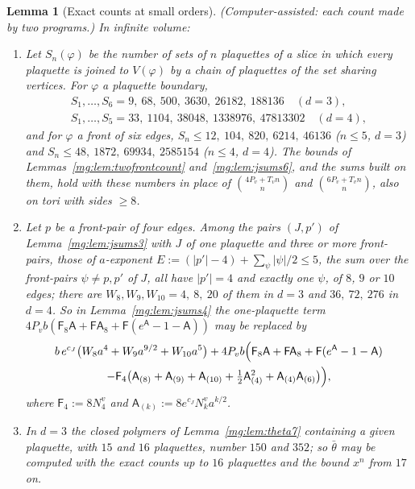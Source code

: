 \documentclass[11pt,a4paper]{article}
\newtheorem{lemma}[theorem]{Lemma}
\theoremstyle{definition}
\theoremstyle{remark}
\begin{document}
\begin{lemma}[Exact counts at small orders]\label{mg:lem:smallcounts}
(Computer-assisted: each count made by two programs.) In infinite volume:
\begin{enumerate}[label=(\roman*)]
\item Let $S_n(\varphi)$ be the number of sets of $n$ plaquettes of a slice in which every plaquette is joined to $V(\varphi)$ by a chain of plaquettes of the set
sharing vertices. For $\varphi$ a plaquette boundary,
\begin{gather*}
S_1,\dots,S_6=9,\ 68,\ 500,\ 3630,\ 26182,\ 188136\quad(d=3),\\
S_1,\dots,S_5=33,\ 1104,\ 38048,\ 1338976,\ 47813302\quad(d=4),
\end{gather*}
and for $\varphi$ a front of six edges, $S_n\le12,\ 104,\ 820,\ 6214,\ 46136$ ($n\le5$, $d=3$) and $S_n\le48,\ 1872,\ 69934,\ 2585154$ ($n\le4$, $d=4$). The bounds of
Lemmas~\ref{mg:lem:twofrontcount} and~\ref{mg:lem:jsums6}, and the sums built on them, hold with these numbers in place of $\binom{4P_v+T_vn}n$ and
$\binom{6P_v+T_vn}n$, also on tori with sides $\ge8$.
\item Let $p$ be a front-pair of four edges. Among the pairs $(J,p')$ of Lemma~\ref{mg:lem:jsums3} with $J$ of one plaquette and three or more front-pairs, those of
$a$-exponent $E:=(|p'|-4)+\sum_\psi|\psi|/2\le5$, the sum over the front-pairs $\psi\ne p,p'$ of $J$, all have $|p'|=4$ and exactly one $\psi$, of $8$, $9$ or $10$ edges;
there are $W_8,W_9,W_{10}=4,\ 8,\ 20$ of them in $d=3$ and $36,\ 72,\ 276$ in $d=4$. So in Lemma~\ref{mg:lem:jsums4} the one-plaquette term
$4P_vb(\mathsf F_8\mathsf A+\mathsf F\mathsf A_8+\mathsf F(e^{\mathsf A}-1-\mathsf A))$ may be replaced by
\begin{multline*}
b\,e^{c_J}\bigl(W_8a^4+W_9a^{9/2}+W_{10}a^5\bigr)+4P_vb\Bigl(\mathsf F_8\mathsf A+\mathsf F\mathsf A_8+\mathsf F(e^{\mathsf A}-1-\mathsf A)\\
-\mathsf F_4\bigl(\mathsf A_{(8)}+\mathsf A_{(9)}+\mathsf A_{(10)}+\tfrac12\mathsf A_{(4)}^2+\mathsf A_{(4)}\mathsf A_{(6)}\bigr)\Bigr),
\end{multline*}
where $\mathsf F_4:=8N^v_4$ and $\mathsf A_{(k)}:=8e^{c_J}N^v_ka^{k/2}$.
\item In $d=3$ the closed polymers of Lemma~\ref{mg:lem:theta7} containing a given plaquette, with $15$ and $16$ plaquettes, number $150$ and $352$; so $\bar\theta$ may be
computed with the exact counts up to $16$ plaquettes and the bound $x^n$ from $17$ on.
\end{enumerate}
\end{lemma}
\end{document}
